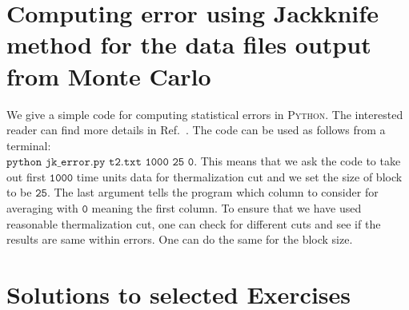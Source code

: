 \documentclass[11pt]{article}
\newcommand{\PY}{\textsc{Python}}
\begin{document}
\begin{footnotesize} 
	\begin{mdframed}[backgroundcolor=mauve!3] 
			
	\end{mdframed} 
\end{footnotesize}


\section{Computing error using Jackknife method for the data files output from Monte Carlo}

We give a simple code for computing statistical errors in \PY. The interested reader can find more details in Ref.~\cite{2012arXiv1210.3781Y}. The code can be used as follows from a terminal: \\ 
$\texttt{python jk\_error.py t2.txt 1000 25 0}$. This means that we ask the code to take out first $\texttt{1000}$ time units data for thermalization cut and we set the size of block to be $\texttt{25}$. The last argument tells the program which column to consider for averaging with $\texttt{0}$ meaning the first column. To ensure that we have used reasonable thermalization cut, one can check for different cuts and see if the results 
are same within errors. One can do the same for the block size. 

\begin{footnotesize} 
	\begin{mdframed}[backgroundcolor=mauve!3] 
			
	\end{mdframed} 
\end{footnotesize}

\section{\label{sec:solutions}Solutions to selected Exercises} 
\end{document}
